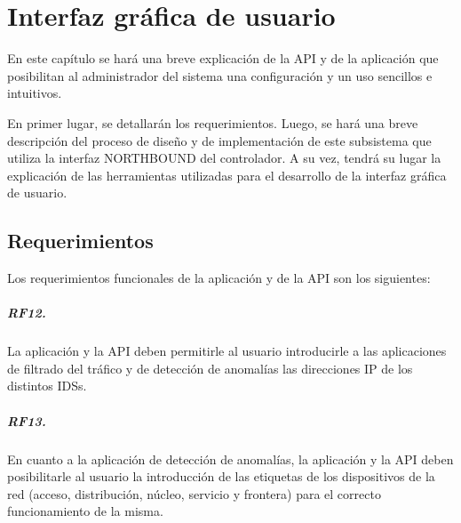 \chapter{Interfaz gráfica de usuario} %

\label{Chapter6} %

En este capítulo se hará una breve explicación de la API y de la aplicación que
posibilitan al administrador del sistema una configuración y un uso sencillos e
intuitivos.

En primer lugar, se detallarán los requerimientos. Luego, se hará una breve
descripción del proceso de diseño y de implementación de este subsistema que
utiliza la interfaz NORTHBOUND del controlador. A su vez, tendrá su lugar la
explicación de las herramientas utilizadas para el desarrollo de la interfaz
gráfica de usuario.

\section{Requerimientos} \label{sec:reqs_gui}

Los requerimientos funcionales de la aplicación y de la API son los siguientes:

\paragraph{RF12.} La aplicación y la API deben permitirle al usuario
introducirle a las aplicaciones de filtrado del tráfico y de detección de
anomalías %
las direcciones IP de los distintos IDSs.

\paragraph{RF13.} En cuanto a la aplicación de detección de anomalías, la
aplicación y la API deben posibilitarle al usuario la introducción de las
etiquetas de los dispositivos de la red (acceso, distribución, núcleo, servicio
y frontera) para el correcto funcionamiento de la misma.
